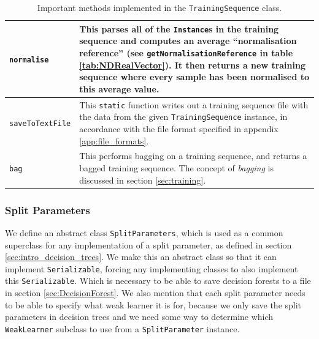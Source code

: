 \documentclass[12pt,twoside,notitlepage]{report}
\begin{document}
\begin{table}[H]
\begin{tabularx}{\textwidth}{p{4.5cm}|X}
                        \texttt{normalise} & 
                            This parses all of the \texttt{Instance}s in the training sequence and computes an average 
                            ``normalisation reference'' (see \texttt{getNormalisationReference} in table 
                            \ref{tab:NDRealVector}). It then returns a new training 
                            sequence where every sample has been normalised to this average value. \\
                        \hline

                        \texttt{saveToTextFile} & 
                            This \texttt{static} function writes out a training sequence file with the data from the 
                            given \texttt{TrainingSequence} instance, in accordance with the file format specified in 
                            appendix \ref{app:file_formats}. \\
                        \hline

                        \texttt{bag} &
                            This performs bagging on a training sequence, and returns a bagged training sequence. The 
                            concept of \textit{bagging} is discussed in section \ref{sec:training}.

                    \end{tabularx}
                    \caption{Important methods implemented in the \texttt{TrainingSequence} class.}
                    \label{tab:TrainingSequence}
                \end{table}





            \subsubsection{Split Parameters} \label{sec:split_params}
                We define an abstract class \texttt{SplitParameters}, which is used as a common superclass for any 
                implementation of a split parameter, as defined in section \ref{sec:intro_decision_trees}. We 
                make this an abstract class so that it can implement \texttt{Serializable}, forcing
                any implementing classes to also implement this \texttt{Serializable}. Which is 
                necessary to be able to save decision forests to a file in section \ref{sec:DecisionForest}. 
                We also mention that each split parameter needs to be 
                able to specify what weak learner it is for, because we only save the split parameters in 
                decision trees and we need some way to determine which \texttt{WeakLearner} subclass to use from a 
                \texttt{SplitParameter} instance. 
\end{document}
